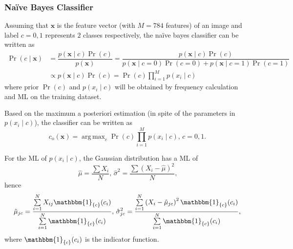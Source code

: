 \documentclass[10pt]{article}
\DeclareMathOperator*{\argmax}{arg\,max}
\begin{document}
\subsubsection{Naïve Bayes Classifier}
Assuming that $\mathbf{x}$ is the feature vector (with $M = 784$ features) of an image and label $c = 0, 1$ represents $2$ classes respectively, the naïve bayes classifier can be written as
\begin{equation} \label{equ1}
\begin{aligned}
\Pr\left(c\mid \mathbf{x}\right) &= \dfrac{p\left(\mathbf{x} \mid c\right)\Pr\left(c\right)}{p\left(\mathbf{x}\right)} = \dfrac{p\left(\mathbf{x} \mid c\right)\Pr\left(c\right)}{p\left(\mathbf{x} \mid c = 0\right)\Pr\left(c = 0\right) + p\left(\mathbf{x} \mid c = 1\right)\Pr\left(c = 1\right)}\\
&\propto p\left(\mathbf{x} \mid c\right)\Pr\left(c\right) = \Pr\left(c\right)\prod\limits_{i = 1}^{M}p\left(x_i \mid c\right)
\end{aligned}
\end{equation}
where prior $\Pr\left(c\right)$ and $p\left(x_i \mid c\right)$ will be obtained by frequency calculation and ML on the training dataset.\par
Based on the maximum a posteriori estimation (in spite of the parameters in $p\left(x_i \mid c\right)$), the classifier can be written as
$$c_{\text{o}}(\mathbf{x}) = \argmax_{c}\Pr\left(c\right)\prod\limits_{i = 1}^{M}p\left(x_i \mid c\right),\, c = 0, 1\text{.}$$\par
For the ML of $p\left(x_i \mid c\right)$, the Gaussian distribution has a ML of
$$\hat{\mu} = \frac{\sum X_i}{N},\, \hat{\sigma}^2 = \frac{\sum\left(X_i - \hat{\mu}\right)^2}{N}\text{,}$$
hence
$$\hat{\mu}_{jc} = \frac{\sum\limits_{i = 1}^NX_{ij}\mathbbm{1}_{\{c\}}(c_i)}{\sum\limits_{i = 1}^N\mathbbm{1}_{\{c\}}(c_i)},\, \hat{\sigma}_{jc}^2 = \dfrac{\sum\limits_{i = 1}^N\left(X_i - \hat{\mu}_{jc}\right)^2\mathbbm{1}_{\{c\}}(c_i)}{\sum\limits_{i = 1}^N\mathbbm{1}_{\{c\}}(c_i)}\text{,}$$
where $\mathbbm{1}_{\{c\}}(c_i)$ is the indicator function.
\end{document}
